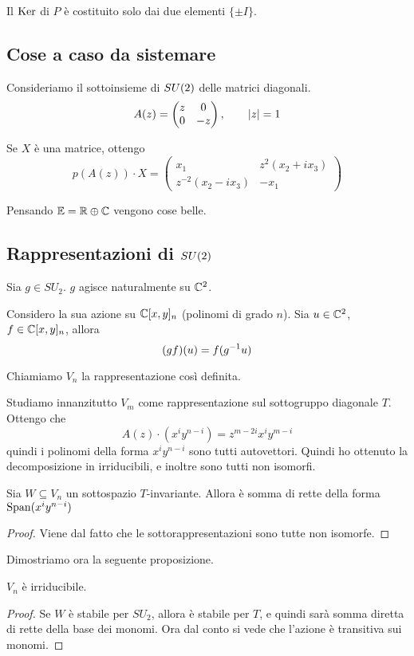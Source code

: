 			\begin{myprop}
				Il $\operatorname{Ker}$ di $P$ è costituito solo dai due elementi $\{\pm I\}$.
			\end{myprop}

		\subsection{Cose a caso da sistemare}

		Consideriamo il sottoinsieme di $SU(2)$ delle matrici diagonali.
		\[
			A(z) = \left(
				\begin{matrix}
				z & 0 \\
				0 & -z
				\end{matrix}
			\right), \qquad \left|z\right|=1
		\]

		Se $X$ è una matrice, ottengo
		\[
			p(A(z))\cdot X = \left( 
			\begin{matrix}
				x_1 & z^2(x_2+ix_3) \\
				z^{-2}(x_2-ix_3) & -x_1
			\end{matrix}
			\right)
		\]

		Pensando $\mathbb E = \mathbb R \oplus \mathbb C$ vengono cose belle.

\subsection{Rappresentazioni di $SU(2)$}
	Sia $g \in SU_2$. $g$ agisce naturalmente su $\mathbb C^2$.
	
	Considero la sua azione su $\mathbb C[x,y]_n$ (polinomi di grado $n$). Sia $u \in \mathbb C^2$, $f \in \mathbb C[x,y]_n$, allora 
	\[
	 (gf)(u) = f(g^{-1} u)
	\]
	
	Chiamiamo $V_n$ la rappresentazione così definita.

	Studiamo innanzitutto $V_m$ come rappresentazione sul sottogruppo diagonale $T$.
	Ottengo che 
	\[
		A(z) \cdot (x^i y^{n-i}) = z^{m-2i}x^iy^{m-i}
	\]
	quindi i polinomi della forma $x^iy^{n-i}$ sono tutti autovettori. Quindi ho ottenuto la decomposizione in irriducibili, e inoltre sono tutti non isomorfi.
	
	\begin{mylemma}
	 Sia $W\subseteq V_n$ un sottospazio $T$-invariante. Allora è somma di rette della forma $\operatorname{Span}(x^iy^{n-i})$
	\end{mylemma}
	\begin{proof}
		Viene dal fatto che le sottorappresentazioni sono tutte non isomorfe.
	\end{proof}

	Dimostriamo ora la seguente proposizione.
	\begin{myprop}
	 $V_n$ è irriducibile.
	\end{myprop}
	\begin{proof}
	 Se $W$ è stabile per $SU_2$, allora è stabile per $T$, e quindi sarà somma diretta di rette della base dei monomi. Ora dal conto si vede che l'azione è transitiva sui monomi. 
	\end{proof}


	



